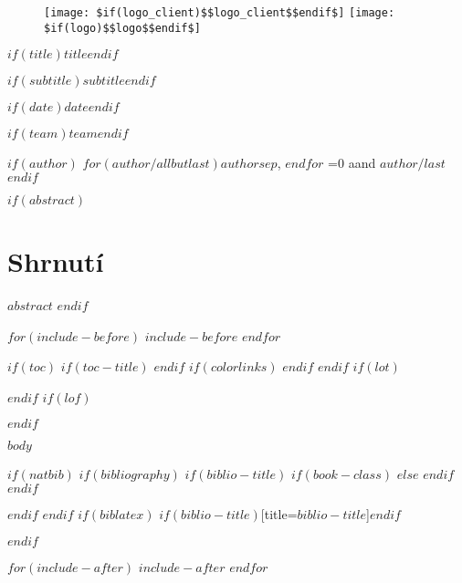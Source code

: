 \documentclass[12pt,a4paper,$for(classoption)$$classoption$$sep$,$endfor$]{$documentclass$}
\newcommand{\tr}[2]{\ifnum\pdfstrcmp{\languagename}{czech}=0 #1\else #2\fi}
\begin{document}
\begin{titlepage}
    \begin{center}

      \onehalfspacing

      \vspace*{1cm}

      \begin{figure}
      \centering
      \texttt{[image: \$if(logo\_client)\$\$logo\_client\$\$endif\$]}%
      \hspace{1.5cm}%
      \texttt{[image: \$if(logo)\$\$logo\$\$endif\$]}%
      \end{figure}

      \vspace{1cm}

      \textbf{\huge $if(title)$$title$$endif$}

      \vspace{.25cm}

      \textit{\Large $if(subtitle)$$subtitle$$endif$}

      \vspace{1cm}

      \large

      $if(date)$$date$$endif$

      \vspace{1cm}

      $if(team)$$team$$endif$

      \vspace{.25cm}

      $if(author)$
      $for(author/allbutlast)$$author$$sep$, $endfor$ \tr{a}{and} $author/last$
      $endif$

      \vspace{1.5cm}

    \end{center}
\end{titlepage}


$if(abstract)$
\thispagestyle{empty}
\section*{Shrnutí}
$abstract$
$endif$

$for(include-before)$
$include-before$
$endfor$

$if(toc)$
{
$if(toc-title)$
\renewcommand*\contentsname{$toc-title$}
$endif$
$if(colorlinks)$
\hypersetup{linkcolor=$if(toccolor)$$toccolor$$else$black$endif$}
$endif$
\setcounter{tocdepth}{$toc-depth$}
\tableofcontents
}
$endif$
$if(lot)$
\listoftables
$endif$
$if(lof)$
\listoffigures
$endif$

$body$

$if(natbib)$
$if(bibliography)$
$if(biblio-title)$
$if(book-class)$
\renewcommand\bibname{$biblio-title$}
$else$
\renewcommand\refname{$biblio-title$}
$endif$
$endif$


$endif$
$endif$
$if(biblatex)$
\printbibliography$if(biblio-title)$[title=$biblio-title$]$endif$

$endif$

$for(include-after)$
$include-after$
$endfor$
\end{document}
